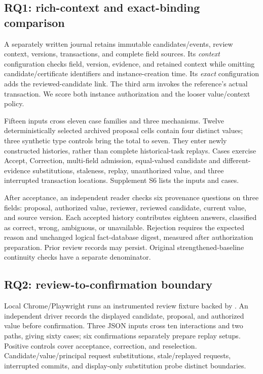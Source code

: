 \subsection{RQ1: rich-context and exact-binding comparison}

A separately written  journal retains immutable candidates/events, review context, versions, transactions, and complete field sources. Its \emph{context} configuration checks field, version, evidence, and retained context while omitting candidate/certificate identifiers and instance-creation time. Its \emph{exact} configuration adds the reviewed-candidate link. The third arm invokes the reference's actual transaction. We score both instance authorization and the looser value/context policy.

Fifteen inputs cross eleven case families and three mechanisms. Twelve deterministically selected archived proposal cells contain four distinct values; three synthetic type controls bring the total to seven. They enter newly constructed histories, rather than complete historical-task replays. Cases exercise Accept, Correction, multi-field admission, equal-valued candidate and different-evidence substitutions, staleness, replay, unauthorized value, and three interrupted transaction locations. Supplement S6 lists the inputs and cases.

After acceptance, an independent reader checks six provenance questions on three fields: proposal, authorized value, reviewer, reviewed candidate, current value, and source version. Each accepted history contributes eighteen answers, classified as correct, wrong, ambiguous, or unavailable. Rejection requires the expected reason and unchanged logical fact-database digest, measured after authorization preparation. Prior review records may persist. Original strengthened-baseline continuity checks have a separate denominator.

\subsection{RQ2: review-to-confirmation boundary}

Local Chrome/Playwright runs an instrumented review fixture backed by . An independent driver records the displayed candidate, proposal, and authorized value before confirmation. Three JSON inputs cross ten interactions and two paths, giving sixty cases; six confirmations separately prepare replay setups. Positive controls cover acceptance, correction, and reselection. Candidate/value/principal request substitutions, stale/replayed requests, interrupted commits, and display-only substitution probe distinct boundaries.

